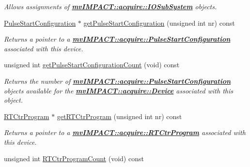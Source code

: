 \begin{DoxyCompactItemize}
\begin{DoxyCompactList}\small\item\em Allows assignments of {\bfseries \hyperlink{classmv_i_m_p_a_c_t_1_1acquire_1_1_i_o_sub_system}{mv\+I\+M\+P\+A\+C\+T\+::acquire\+::\+I\+O\+Sub\+System}} objects. \end{DoxyCompactList}\item 
\hyperlink{classmv_i_m_p_a_c_t_1_1acquire_1_1_pulse_start_configuration}{Pulse\+Start\+Configuration} $\ast$ \hyperlink{classmv_i_m_p_a_c_t_1_1acquire_1_1_i_o_sub_system_af699c6e691ece416ec2242d08e35cb58}{get\+Pulse\+Start\+Configuration} (unsigned int nr) const 
\begin{DoxyCompactList}\small\item\em Returns a pointer to a {\bfseries \hyperlink{classmv_i_m_p_a_c_t_1_1acquire_1_1_pulse_start_configuration}{mv\+I\+M\+P\+A\+C\+T\+::acquire\+::\+Pulse\+Start\+Configuration}} associated with this device. \end{DoxyCompactList}\item 
\hypertarget{classmv_i_m_p_a_c_t_1_1acquire_1_1_i_o_sub_system_a6f33bc4f6613b7c8b268beba61a09661}{unsigned int \hyperlink{classmv_i_m_p_a_c_t_1_1acquire_1_1_i_o_sub_system_a6f33bc4f6613b7c8b268beba61a09661}{get\+Pulse\+Start\+Configuration\+Count} (void) const }\label{classmv_i_m_p_a_c_t_1_1acquire_1_1_i_o_sub_system_a6f33bc4f6613b7c8b268beba61a09661}

\begin{DoxyCompactList}\small\item\em Returns the number of {\bfseries \hyperlink{classmv_i_m_p_a_c_t_1_1acquire_1_1_pulse_start_configuration}{mv\+I\+M\+P\+A\+C\+T\+::acquire\+::\+Pulse\+Start\+Configuration}} objects available for the {\bfseries \hyperlink{classmv_i_m_p_a_c_t_1_1acquire_1_1_device}{mv\+I\+M\+P\+A\+C\+T\+::acquire\+::\+Device}} associated with this object. \end{DoxyCompactList}\item 
\hyperlink{classmv_i_m_p_a_c_t_1_1acquire_1_1_r_t_ctr_program}{R\+T\+Ctr\+Program} $\ast$ \hyperlink{classmv_i_m_p_a_c_t_1_1acquire_1_1_i_o_sub_system_a1b2329037b2d00dda936ad2e33b92471}{get\+R\+T\+Ctr\+Program} (unsigned int nr) const 
\begin{DoxyCompactList}\small\item\em Returns a pointer to a {\bfseries \hyperlink{classmv_i_m_p_a_c_t_1_1acquire_1_1_r_t_ctr_program}{mv\+I\+M\+P\+A\+C\+T\+::acquire\+::\+R\+T\+Ctr\+Program}} associated with this device. \end{DoxyCompactList}\item 
\hypertarget{classmv_i_m_p_a_c_t_1_1acquire_1_1_i_o_sub_system_ae93c1931f9b2c53d8e1aaa7c74afccc8}{unsigned int \hyperlink{classmv_i_m_p_a_c_t_1_1acquire_1_1_i_o_sub_system_ae93c1931f9b2c53d8e1aaa7c74afccc8}{R\+T\+Ctr\+Program\+Count} (void) const }\label{classmv_i_m_p_a_c_t_1_1acquire_1_1_i_o_sub_system_ae93c1931f9b2c53d8e1aaa7c74afccc8}


\end{DoxyCompactItemize}
